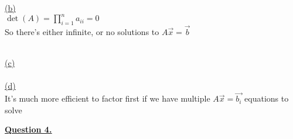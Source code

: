 \documentclass[12pt]{article}
\begin{document}




\newpage\hyperlink{toc}{\hypertarget{3.2}{(b)}}\\
$\det(A) = \prod_{i=1}^{n}a_{ii} = 0$\\
So there's either infinite, or no solutions to $A\vec{x} = \vec{b}$

\noindent ~\\\hyperlink{toc}{\hypertarget{3.3}{(c)}}\\
\noindent ~\\\hyperlink{toc}{\hypertarget{3.4}{(d)}}\\
It's much more efficient to factor first if we have multiple $A\vec{x} = \vec{b_i}$ equations to solve

\newpage
\noindent \hyperlink{toc}{\hypertarget{4}{\LARGE \underline{\textbf{Question 4.}}}}\\\\
\end{document}

